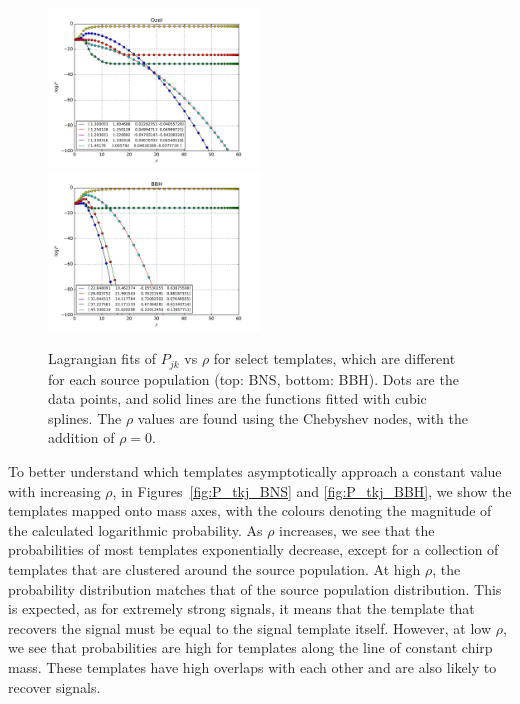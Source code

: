 \documentclass[twocolumn,showpacs,unsortedaddress,superscriptaddress,showkeys,nofootinbib,preprintnumbers,letterpaper]{revtex4-1}
\begin{document}
\begin{figure}
\includegraphics[width=0.5\textwidth]{lnP_vs_rho_Ozel.pdf}
\includegraphics[width=0.5\textwidth]{lnP_vs_rho_BBH.pdf}
\caption{Lagrangian fits of $P_{jk}$ vs $\rho$ for select templates, which are different for each source population (top: BNS, bottom: BBH). Dots are the data points, and solid lines are the functions fitted with cubic splines. The $\rho$ values are found using the Chebyshev nodes, with the addition of $\rho=0$.}
\label{fig:Pvsrho}
\end{figure}

To better understand which templates asymptotically approach a constant value with increasing $\rho$, in Figures~\ref{fig:P_tkj_BNS} and \ref{fig:P_tkj_BBH}, we show the templates mapped onto mass axes, with the colours denoting the magnitude of the calculated logarithmic probability. As $\rho$ increases, we see that the probabilities of most templates exponentially decrease, except for a collection of templates that are clustered around the source population. At high $\rho$, the probability distribution matches that of the source population distribution. This is expected, as for extremely strong signals, it means that the template that recovers the signal must be equal to the signal template itself. However, at low $\rho$, we see that probabilities are high for templates along the line of constant chirp mass. These templates have high overlaps with each other and are also likely to recover signals.

\end{document}
